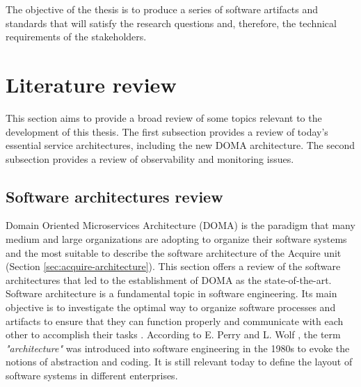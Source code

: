 \documentclass[english, 12pt, a4paper, sci, utf8, a-1b, online]{aaltothesis}
\begin{document}
The objective of the thesis is to produce a series of software artifacts and standards that will satisfy the research questions and, therefore, the technical requirements of the stakeholders.

\clearpage
\section{Literature review}


This section aims to provide a broad review of some topics relevant to the development of this thesis. The first subsection provides a review of today's essential service architectures, including the new DOMA architecture. The second subsection provides a review of observability and monitoring issues.

\subsection{Software architectures review}


Domain Oriented Microservices Architecture (DOMA) is the paradigm that many medium and large organizations are adopting to organize their software systems and the most suitable to describe the software architecture of the Acquire unit (Section  \ref{sec:acquire-architecture}). This section offers a review of the software architectures that led to the establishment of DOMA as the state-of-the-art.\\

Software architecture is a fundamental topic in software engineering. Its main objective is to investigate the optimal way to organize software processes and artifacts to ensure that they can function properly and communicate with each other to accomplish their tasks \cite{shadija2017towards}. According to E. Perry and L. Wolf \cite{perry1992foundations}, the term \textit{"architecture"} was introduced into software engineering in the 1980s to evoke the notions of abstraction and coding. It is still relevant today to define the layout of software systems in different enterprises.\\
\end{document}
